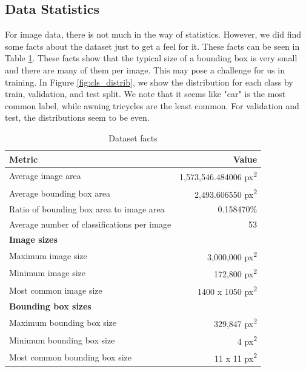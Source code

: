 \documentclass[stu,12pt,floatsintext]{apa7}
\begin{document}
\subsection{Data Statistics}
For image data, there is not much in the way of statistics. However, we did find some facts about the dataset just to get a feel for it. These facts can be seen in Table \ref{tab:facts}. These facts show that the typical size of a bounding box is very small and there are many of them per image. This may pose a challenge for us in training. In Figure \ref{fig:cls_distrib}, we show the distribution for each class by train, validation, and test split. We note that it seems like "car" is the most common label, while awning tricycles are the least common. For validation and test, the distributions seem to be even.

\begin{table}[!htb]
	\centering
	\begin{tabular}{lr}
		\hline
		\textbf{Metric}                             & \textbf{Value}                         \\
		\hline
		Average image area                          & 1,573,546.484006 px\textsuperscript{2} \\
		Average bounding box area                   & 2,493.606550 px\textsuperscript{2}     \\
		Ratio of bounding box area to image area    & 0.158470\%                             \\
		Average number of classifications per image & 53                                     \\
		\hline
		\textbf{Image sizes}                        &                                        \\
		\hline
		Maximum image size                          & 3,000,000 px\textsuperscript{2}        \\
		Minimum image size                          & 172,800 px\textsuperscript{2}          \\
		Most common image size                      & 1400 x 1050 px\textsuperscript{2}      \\
		\hline
		\textbf{Bounding box sizes}                 &                                        \\
		\hline
		Maximum bounding box size                   & 329,847 px\textsuperscript{2}          \\
		Minimum bounding box size                   & 4 px\textsuperscript{2}                \\
		Most common bounding box size               & 11 x 11 px\textsuperscript{2}          \\
		\hline
	\end{tabular}
	\caption{Dataset facts}
	\label{tab:facts}
\end{table}
\end{document}
